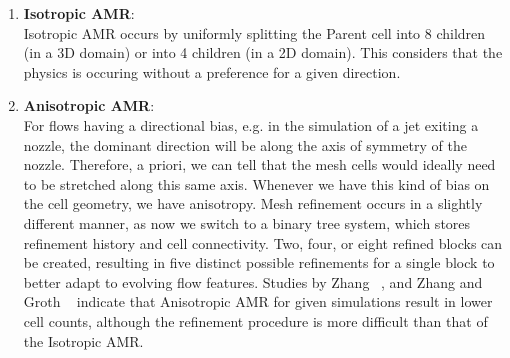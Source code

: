 \begin{enumerate}
\item \textbf{Isotropic AMR}:\\
Isotropic AMR  occurs by uniformly splitting the Parent cell into 8 children (in a 3D domain) or into 4 children (in a 2D domain). This considers that the physics is occuring without a preference for a given direction.
\item \textbf{Anisotropic AMR}: \\
For flows having a directional bias, e.g. in the simulation of a jet exiting a nozzle, the dominant direction will be along the axis of symmetry of the nozzle. Therefore, a priori, we can tell that the mesh cells would ideally need to be stretched along this same axis. Whenever we have this kind of bias on the cell geometry, we have anisotropy. Mesh refinement occurs in a slightly different manner, as now we switch to a binary tree system, which stores refinement history and cell connectivity. Two, four, or eight refined
blocks can be created, resulting in five distinct possible refinements for a single block to better adapt to evolving flow features. Studies by Zhang ~\cite{Zhang:2011b}, and Zhang and Groth ~\cite{Zhang:2011a} indicate that Anisotropic AMR for given simulations result in lower cell counts, although the refinement procedure is more difficult than that of the Isotropic AMR.
\end{enumerate}
